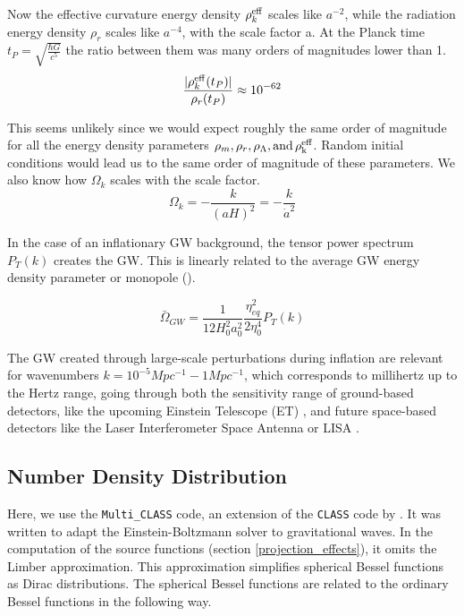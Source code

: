 Now the effective curvature energy density $\rho_{k}^{\rm{eff}}$ scales like $a^{-2}$, while the radiation energy density $\rho_{r}$ scales like $a^{-4}$, with the scale factor a.
At the Planck time $t_P = \sqrt{\frac{\hbar G}{c^5}}$ the ratio between them was many orders of magnitudes lower than 1.
\begin{equation}
    \frac{|\rho_k^{\rm{eff}}(t_P)|}{\rho_r(t_P)} \approx 10^{-62}
\end{equation}

This seems unlikely since we would expect roughly the same order of magnitude for all the energy density parameters $\rho_m, \rho_r, \rho_\Lambda, \rm{ and } \, \rho_k^{eff}$. Random initial conditions would lead us to the same order of magnitude of these parameters.
We also know how $\Omega_k$ scales with the scale factor.
\begin{equation}
    \Omega_k = - \frac{k}{(aH)^2}= -\frac{k}{\dot{a}^2}
\end{equation}

In the case of an inflationary GW background, the tensor power spectrum $P_T(k)$ creates the GW. This is linearly related to the average GW energy density parameter or monopole (\cite{schulze_gw_class_2023}).

\begin{equation}
    \bar{\Omega}_{GW} = \frac{1}{12 H_0^2 a_0^2} \frac{\eta_{eq}^2}{2\eta_0^4} P_T(k)
\end{equation}

The GW created through large-scale perturbations during inflation are relevant for wavenumbers $k=10^{-5} Mpc^{-1} -1 Mpc^{-1}$, which corresponds to millihertz up to the Hertz range, going through both the sensitivity range of ground-based detectors, like the upcoming Einstein Telescope (ET) \cite{alonso_noise_2020}, and future space-based detectors like the Laser Interferometer Space Antenna or LISA \cite{robson_construction_2019}.


\subsection{Number Density Distribution}

Here, we use the {\tt Multi\_CLASS} code, an extension of the {\tt CLASS} code by \cite{bellomo_beware_2020}. It was written to adapt the Einstein-Boltzmann solver to gravitational waves. In the computation of the source functions (section \ref{projection_effects}), it omits the Limber approximation. This approximation simplifies spherical Bessel functions as Dirac distributions. The spherical Bessel functions are related to the ordinary Bessel functions in the following way.

